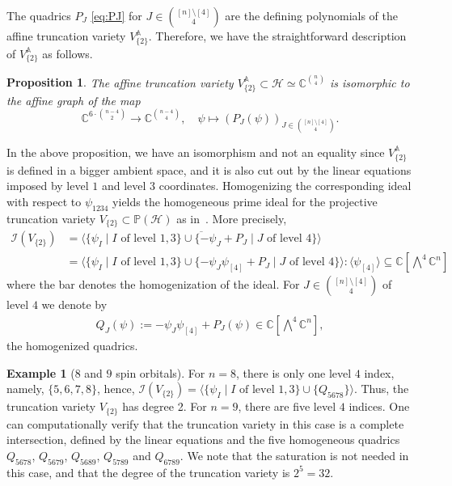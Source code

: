 \documentclass[11pt,reqno]{amsart}
\newtheorem{proposition}[theorem]{Proposition}
\theoremstyle{definition}
\newtheorem{example}[theorem]{Example}
\numberwithin{theorem}{section}
\newcommand{\CC}{\mathbb{C} }
\numberwithin{equation}{section}
\begin{document}
\noindent The quadrics $P_J$ \eqref{eq:PJ} for $J \in \binom{[n] \setminus [4]}{4}$ are the defining polynomials of the affine truncation variety $V_{\{2\}}^{\mathbb A}$. Therefore, we have the straightforward description of $V_{\{2\}}^{\mathbb A}$ as follows.


\begin{proposition}\label{prop:defeqs}
The affine truncation variety $V_{\{2\}}^{\mathbb A} \subset \mathcal{H}\simeq \mathbb C^{{n \choose 4}}$ is isomorphic to
the affine graph of the map
$$
\CC^{6 \cdot \binom{n - 4}{2}} \to \CC^{\binom{n - 4}{4}}, \quad \psi \mapsto (P_J(\psi))_{J \in {{[n]\setminus [4]} \choose 4}}.
$$
\end{proposition}

\indent In the above proposition, we have an isomorphism and not an equality since $V_{\{2\}}^{\mathbb A}$ is defined in a bigger ambient space, and it is also cut out by the linear equations imposed by level $1$ and level $3$ coordinates.
Homogenizing the corresponding ideal with respect to $\psi_{1234}$ yields the homogeneous prime ideal for the projective truncation variety $V_{\{2\}} \subset \mathbb P(\mathcal{H})$ as in~\cite[Theorem 3.2]{faulstich2024algebraic}. More precisely,
\begin{align*}
\mathcal I(V_{\{2\}}) &= \overline{\langle \{\psi_I \mid I \text{ of level }1,3\} \cup \{ - \psi_J + P_J \mid J \text{ of level }4\} \rangle} \\
&=
\langle \{\psi_I \mid I \text{ of level }1,3\} \cup \{ - \psi_J \psi_{[4]} + P_J \mid J \text{ of level }4\} \rangle: \langle\psi_{[4]}\rangle \subseteq 
\mathbb C[\textstyle{\bigwedge^4 \mathbb C^n}]
\end{align*}
where the bar denotes the homogenization of the ideal. 
For $J \in {{[n]\setminus [4]} \choose 4}$ of level $4$ we denote by 
\begin{align}\label{homogenized quadrics}
Q_{J}(\psi) := -\psi_{J}\psi_{[4]} + P_{J}(\psi)\in \mathbb C[\textstyle{\bigwedge^4 \mathbb C^n}],
\end{align}
the homogenized quadrics. 


\begin{example}[$8$ and $9$ spin orbitals]\label{ex: 8 and 9 spin orbitals}
For $n=8$, there is only one level $4$ index, namely, $\{5,6,7,8\}$, hence, $\mathcal I(V_{\{2\}}) = \langle \{\psi_I \mid I \text{ of level }1,3\} \cup \{Q_{5678}\} \rangle$. Thus, the truncation variety $V_{\{2\}}$ has degree 2. 
For $n=9$, there are five level $4$ indices. One can computationally verify that the truncation variety in this case is a complete intersection, defined by the linear equations and the five homogeneous quadrics $Q_{5678}$, $Q_{5679}$, $Q_{5689}$, $Q_{5789}$ and $Q_{6789}$. We note that the saturation is not needed in this case, and that the degree of the truncation variety is $2^5 = 32$.
\end{example}
\end{document}
